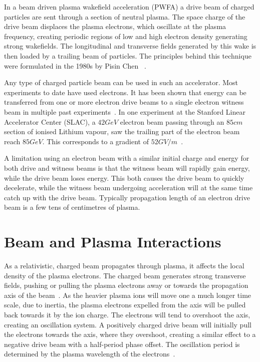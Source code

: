 In a beam driven plasma wakefield acceleration (PWFA) a drive beam of charged particles are sent through a section of neutral plasma. The space charge of the drive beam displaces the plasma electrons, which oscillate at the plasma frequency, creating periodic regions of low and high electron density generating strong wakefields. The longitudinal and transverse fields generated by this wake is then loaded by a trailing beam of particles. The principles behind this technique were formulated in the 1980s by Pisin Chen \etal~\cite{chen:1985}.

Any type of charged particle beam can be used in such an accelerator. Most experiments to date have used electrons. It has been shown that energy can be transferred from one or more electron drive beams to a single electron witness beam in multiple past experiments~\cite{rosenzweig:1988, blumenfeld:2007, kallos:2007, litos:2014, nakajima:1990}. In one experiment at the Stanford Linear Accelerator Center (SLAC), a $42\unit{GeV}$ electron beam passing through an $85\unit{cm}$ section of ionised Lithium vapour, saw the trailing part of the electron beam reach $85\unit{GeV}$. This corresponds to a gradient of $52\unit{GV/m}$~\cite{blumenfeld:2007}.

A limitation using an electron beam with a similar initial charge and energy for both drive and witness beams is that the witness beam will rapidly gain energy, while the drive beam loses energy. This both causes the drive beam to quickly decelerate, while the witness beam undergoing acceleration will at the same time catch up with the drive beam. Typically propagation length of an electron drive beam is a few tens of centimetres of plasma.

\section{Beam and Plasma Interactions}
\label{Int:BPI}

As a relativistic, charged beam propagates through plasma, it affects the local density of the plasma electrons. The charged beam generates strong transverse fields, pushing or pulling the plasma electrons away or towards the propagation axis of the beam~\cite{lee:2001,adli:2016b}. As the heavier plasma ions will move one a much longer time scale, due to inertia, the plasma electrons expelled from the axis will be pulled back towards it by the ion charge. The electrons will tend to overshoot the axis, creating an oscillation system. A positively charged drive beam will initially pull the electrons towards the axis, where they overshoot, creating a similar effect to a negative drive beam with a half-period phase offset. The oscillation period is determined by the plasma wavelength of the electrons~\cite{hogan:2016,muggli:2017}. 

